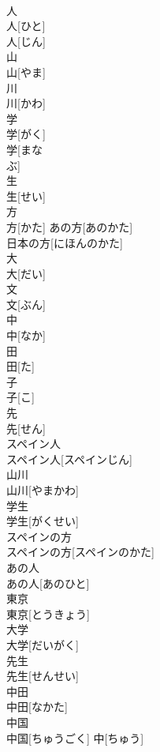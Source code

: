 \documentclass[8pt]{extreport}
\begin{document}
\begin{CJK}{UTF8}{min}
\\	人	
\\	人[ひと] 
\\	人[じん]	
\\	山	
\\	山[やま]	
\\	川	
\\	川[かわ]	
\\	学	
\\	学[がく] 
\\	学[まな 
\\	ぶ]	
\\	生	
\\	生[せい]	
\\	方	
\\	方[かた]	あの方[あのかた] 
\\	日本の方[にほんのかた] 
\\	大	
\\	大[だい]	
\\	文	
\\	文[ぶん]	
\\	中	
\\	中[なか]	
\\	田	
\\	田[た]	
\\	子	
\\	子[こ]	
\\	先	
\\	先[せん]	
\\	スペイン人	
\\	スペイン人[スペインじん]	
\\	山川	
\\	山川[やまかわ]	
\\	学生	
\\	学生[がくせい]	
\\	スペインの方	
\\	スペインの方[スペインのかた]	
\\	あの人	
\\	あの人[あのひと]	
\\	東京	
\\	東京[とうきょう]	
\\	大学	
\\	大学[だいがく]	
\\	先生	
\\	先生[せんせい]	
\\	中田	
\\	中田[なかた]	
\\	中国	
\\	中国[ちゅうごく]	中[ちゅう] 

\end{CJK}
\end{document}
